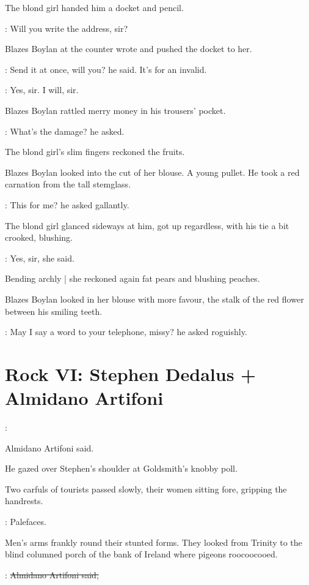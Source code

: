The blond girl handed him a docket and pencil.

\blondgirl:
Will you write the address,
sir?

Blazes Boylan at the counter wrote and pushed the docket to her.

\boylan:
Send it at once, will you?
he said.
It's for an invalid.

\blondgirl:
Yes, sir. I will, sir.

Blazes Boylan rattled merry money in his trousers' pocket.

\boylan:
What's the damage?
he asked.

The blond girl's slim fingers reckoned the fruits.

Blazes Boylan looked into the cut of her blouse.
A young pullet.
He took a red carnation from the tall stemglass.

\boylan:
This for me?
he asked gallantly.

The blond girl glanced sideways at him,
got up regardless,
with his tie a bit crooked,
blushing.

\blondgirl:
Yes, sir,
she said.

Bending archly |
she reckoned again fat pears and blushing peaches.

Blazes Boylan looked in her blouse with more favour,
the stalk of the red flower between his smiling teeth.

\boylan:
May I say a word to your telephone, missy?
he asked roguishly.


\section*{Rock VI: Stephen Dedalus + Almidano Artifoni}


\artifoni:

Almidano Artifoni said.

He gazed over Stephen's shoulder at Goldsmith's knobby poll.

Two carfuls of tourists passed slowly,
their women sitting fore,
gripping the handrests.

\StephenInt:
Palefaces.

Men's arms frankly round their stunted forms.
They looked from Trinity
to the blind columned porch of the bank of Ireland
where pigeons roocoocooed.

\artifoni:
\sout{Almidano Artifoni said,}

